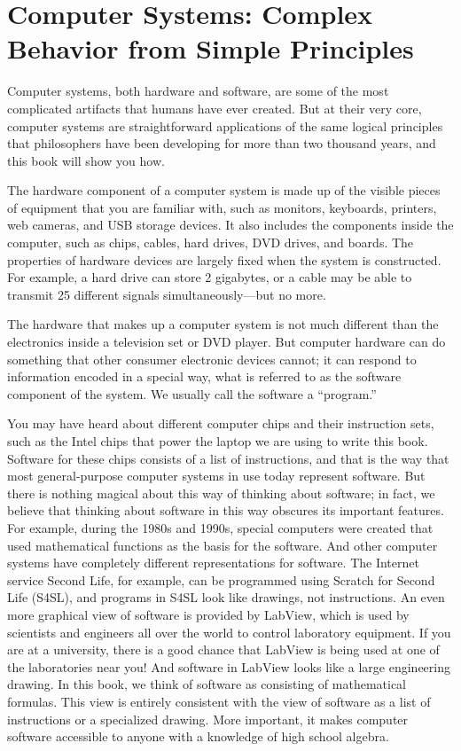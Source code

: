 \chapter{Computer Systems: Complex Behavior from Simple Principles}

Computer systems, both hardware and software, are some of the
most complicated artifacts that humans have ever created. But at
their very core, computer systems are straightforward
applications of the same logical principles that philosophers
have been developing for more than two thousand years, and
this book will show you how.

The hardware component of a computer system is made up of the visible
pieces of equipment that you are familiar with, such as monitors,
keyboards, printers, web cameras, and USB storage devices.  It also
includes the 
components inside the computer, such as chips, cables, hard
drives, DVD drives, and boards. 
The properties of hardware devices are largely fixed when the system is
constructed. For example, a hard drive can store 2 gigabytes,
or a cable may be able to transmit 25 different signals
simultaneously---but no more. 

The hardware that makes up a computer system is not much different
than the electronics inside a television set or DVD
player. But computer hardware can do something that other
consumer electronic devices cannot; it can respond to 
information encoded in a special way, what is 
referred to as the software component of the system.  We usually
call the software a ``program.''

You may have heard
about different computer chips and their instruction sets, such
as the Intel chips that power the laptop we are using to
write this book.  Software for these chips consists of a list of
instructions, and that is the way that most general-purpose computer
systems in use today represent software.
But there is nothing magical about this way of thinking about
software; in fact, we believe that thinking about software in this 
way obscures its important features.  For example, during the 1980s
and 1990s, special computers were created that used mathematical
functions as the basis for the software.  And other computer
systems have completely different representations for software.
The Internet service Second Life, for example, can be programmed 
using Scratch for Second Life (S4SL), and programs in S4SL look
like drawings, not instructions.  An even more graphical view of
software is provided by LabView, which is used by scientists and
engineers all over the world to control laboratory equipment.
If you are at a university, there is a good chance
that LabView is being used at one of the laboratories near you!
And software in LabView looks like a large engineering drawing.
In this book, we think of software as consisting of mathematical
formulas.  This view is entirely consistent with the view of
software as a list of instructions or a specialized drawing.  More
important, it makes computer software accessible to anyone with a 
knowledge of high school algebra.

